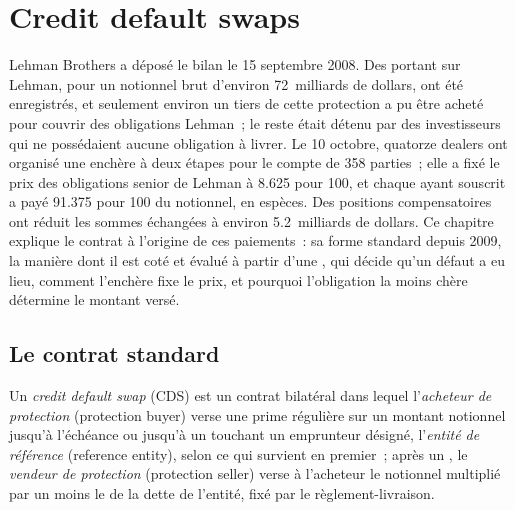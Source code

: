 \chapter{Credit default swaps}\label{ch:m2:credit-default-swaps}

Lehman Brothers a déposé le bilan le 15 septembre 2008. Des 
portant sur Lehman, pour un notionnel brut d'environ 72~milliards de dollars, ont été enregistrés, et seulement environ
un tiers de cette protection a pu être acheté pour couvrir des obligations Lehman~; le reste était
détenu par des investisseurs qui ne possédaient aucune obligation à livrer. Le 10 octobre, quatorze dealers
ont organisé une enchère à deux étapes pour le compte de 358 parties~; elle a fixé le prix des obligations senior de Lehman à
8.625 pour 100, et chaque  ayant souscrit a payé 91.375 pour 100 du
notionnel, en espèces. Des positions compensatoires ont réduit les sommes échangées à environ
5.2~milliards de dollars. Ce chapitre explique le contrat à l'origine de ces paiements~: sa
forme standard depuis 2009, la manière dont il est coté et évalué à partir d'une , qui
décide qu'un défaut a eu lieu, comment l'enchère fixe le prix, et pourquoi l'obligation la moins chère
détermine le montant versé.

\section{Le contrat standard}

\begin{definition}\label{def:m2:credit-default-swaps:cds}
Un \emph{credit default swap} (CDS) est un contrat bilatéral dans lequel
l'\emph{acheteur de protection} (protection buyer) verse une prime régulière sur un
montant notionnel jusqu'à l'échéance ou jusqu'à un  touchant un emprunteur désigné,
l'\emph{entité de référence} (reference entity), selon ce qui survient en premier~; après un
, le \emph{vendeur de protection} (protection seller) verse à l'acheteur le
notionnel multiplié par un moins le  de la dette de l'entité, fixé par le règlement-livraison.
\end{definition}

